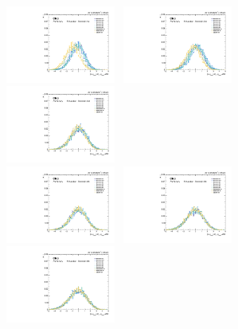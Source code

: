 \begin{figure}[p]
  \centering
  \includegraphics[width=0.32\textwidth]{Fig/BiasStudy/Pull/ZJpsiG_Cat1/pull_fitfunc0_leastbias}~
  \includegraphics[width=0.32\textwidth]{Fig/BiasStudy/Pull/ZJpsiG_Cat1/pull_fitfunc1_leastbias}~
  \includegraphics[width=0.32\textwidth]{Fig/BiasStudy/Pull/ZJpsiG_Cat1/pull_fitfunc2_leastbias}\\
  \includegraphics[width=0.32\textwidth]{Fig/BiasStudy/Pull/ZJpsiG_Cat1/pull_fitfunc3_leastbias}~
  \includegraphics[width=0.32\textwidth]{Fig/BiasStudy/Pull/ZJpsiG_Cat1/pull_fitfunc4_leastbias}~
  \includegraphics[width=0.32\textwidth]{Fig/BiasStudy/Pull/ZJpsiG_Cat1/pull_fitfunc5_leastbias}\\

\end{figure}
